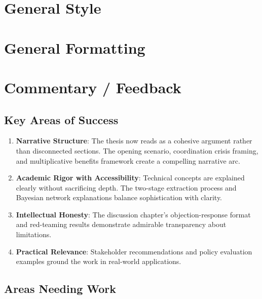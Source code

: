 \documentclass[
  11pt,
  letterpaper,
]{book}
\begin{document}
\section{General Style}\label{general-style}

\section{General Formatting}\label{general-formatting}

\section{Commentary / Feedback}\label{commentary-feedback}

\subsection{Key Areas of Success}\label{key-areas-of-success}

\begin{enumerate}
\def\labelenumi{\arabic{enumi}.}
\item
  \textbf{Narrative Structure}: The thesis now reads as a cohesive
  argument rather than disconnected sections. The opening scenario,
  coordination crisis framing, and multiplicative benefits framework
  create a compelling narrative arc.
\item
  \textbf{Academic Rigor with Accessibility}: Technical concepts are
  explained clearly without sacrificing depth. The two-stage extraction
  process and Bayesian network explanations balance sophistication with
  clarity.
\item
  \textbf{Intellectual Honesty}: The discussion chapter's
  objection-response format and red-teaming results demonstrate
  admirable transparency about limitations.
\item
  \textbf{Practical Relevance}: Stakeholder recommendations and policy
  evaluation examples ground the work in real-world applications.
\end{enumerate}

\subsection{Areas Needing Work}\label{areas-needing-work}
\end{document}
